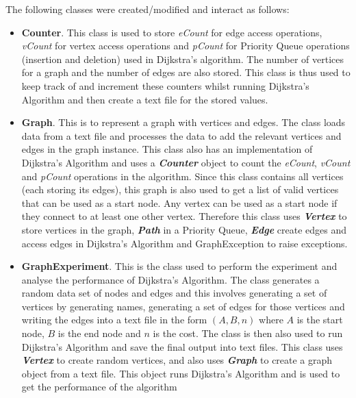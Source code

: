 \documentclass{assignment}
\begin{document}
The following classes were created/modified and interact as follows:
\begin{itemize}
    \item \textbf{Counter}. This class is used to store \textit{eCount} for edge access operations, \textit{vCount} for vertex access operations and \textit{pCount} for Priority Queue operations (insertion and deletion) used in Dijkstra's algorithm. The number of vertices for a graph and the number of edges are also stored. This class is thus used to keep track of and increment these counters whilst running Dijkstra's Algorithm and then create a text file for the stored values.
    
    \item \textbf{Graph}. This is to represent a graph with vertices and edges. The class loads data from a text file and processes the data to add the relevant vertices and edges in the graph instance. This class also has an implementation of Dijkstra's Algorithm and uses a \textbf{\textit{Counter}} object to count the \textit{eCount}, \textit{vCount} and \textit{pCount} operations in the algorithm. Since this class contains all vertices (each storing its edges), this graph is also used to get a list of valid vertices that can be used as a start node. Any vertex can be used as a start node if they connect to at least one other vertex. Therefore this class uses \textbf{\textit{Vertex}} to store vertices in the graph, \textbf{\textit{Path}} in a Priority Queue, \textbf{\textit{Edge}} create edges and access edges in Dijkstra's Algorithm and GraphException to raise exceptions. 
    
    \item \textbf{GraphExperiment}. This is the class used to perform the experiment and analyse the performance of Dijkstra's Algorithm. The class generates a random data set of nodes and edges and this involves generating a set of vertices by generating names, generating a set of edges for those vertices and writing the edges into a text file in the form $(A, B, n)$ where $A$ is the start node, $B$ is the end node and $n$ is the cost. The class is then also used to run Dijkstra's Algorithm and save the final output into text files. This class uses \textbf{\textit{Vertex}} to create random vertices, and also uses \textit{\textbf{Graph}} to create a graph object from a text file. This object runs Dijkstra's Algorithm and is used to get the performance of the algorithm
    
\end{itemize}
\end{document}
